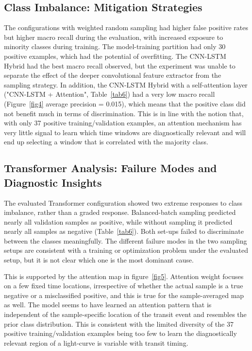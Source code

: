 \documentclass[preprint,11pt,times]{elsarticle}
\begin{document}
\subsection{Class Imbalance: Mitigation Strategies}\label{subsec7c}

The configurations with weighted random sampling had higher false positive rates but higher macro recall during the evaluation, with increased exposure to minority classes during training. The model-training partition had only 30 positive examples, which had the potential of overfitting. The CNN-LSTM Hybrid had the best macro recall observed, but the experiment was unable to separate the effect of the deeper convolutional feature extractor from the sampling strategy. In addition, the CNN-LSTM Hybrid with a self-attention layer ("CNN-LSTM + Attention", Table~\ref{tab6}) had a very low macro recall (Figure~\ref{fig4} average precision = 0.015), which means that the positive class did not benefit much in terms of discrimination. This is in line with the notion that, with only 37 positive training/validation examples, an attention mechanism has very little signal to learn which time windows are diagnostically relevant and will end up selecting a window that is correlated with the majority class.

\subsection{Transformer Analysis: Failure Modes and Diagnostic Insights}\label{subsec7d}

The evaluated Transformer configuration showed two extreme responses to class imbalance, rather than a graded response. Balanced-batch sampling predicted nearly all validation samples as positive, while without sampling it predicted nearly all samples as negative (Table~\ref{tab6}). Both set-ups failed to discriminate between the classes meaningfully. The different failure modes in the two sampling setups are consistent with a training or optimization problem under the evaluated setup, but it is not clear which one is the most dominant cause.

This is supported by the attention map in figure~\ref{fig5}. Attention weight focuses on a few fixed time locations, irrespective of whether the actual sample is a true negative or a misclassified positive, and this is true for the sample-averaged map as well. The model seems to have learned an attention pattern that is independent of the sample-specific location of the transit event and resembles the prior class distribution. This is consistent with the limited diversity of the 37 positive training/validation examples being too few to learn the diagnostically relevant region of a light-curve is variable with transit timing.
\end{document}
